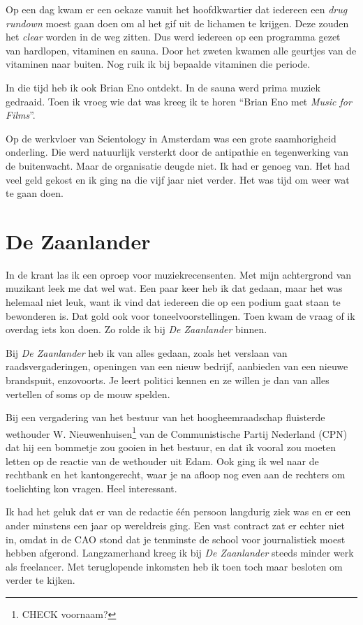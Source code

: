 \documentclass[12pt,twoside]{memoir}
\begin{document}
Op een dag kwam er een oekaze vanuit het hoofdkwartier dat iedereen een \emph{drug rundown} moest gaan doen om al het gif uit de lichamen te krijgen. Deze zouden het \emph{clear} worden in de weg zitten. Dus werd iedereen op een programma gezet van hardlopen, vitaminen en sauna. Door het zweten kwamen alle geurtjes van de vitaminen naar buiten. Nog ruik ik bij bepaalde vitaminen die periode. 

In die tijd heb ik ook Brian Eno ontdekt. In de sauna werd prima muziek gedraaid. Toen ik vroeg wie dat was kreeg ik te horen ``Brian Eno met \emph{Music for Films}''.

Op de werkvloer van Scientology in Amsterdam was een grote saamhorigheid onderling. Die werd natuurlijk versterkt door de antipathie en tegenwerking van de buitenwacht. Maar de organisatie deugde niet. Ik had er genoeg van. Het had veel geld gekost en ik ging na die vijf jaar niet verder. Het was tijd om weer wat te gaan doen.

\chapter{De Zaanlander} %
\label{cha:zaanlander}

In de krant las ik een oproep voor muziekrecensenten. Met mijn achtergrond van muzikant leek me dat wel wat. Een paar keer heb ik dat gedaan, maar het was helemaal niet leuk, want ik vind dat iedereen die op een podium gaat staan te bewonderen is. Dat gold ook voor toneelvoorstellingen. Toen kwam de vraag of ik overdag iets kon doen. Zo rolde ik bij \emph{De Zaanlander} binnen. 

Bij \emph{De Zaanlander} heb ik van alles gedaan, zoals het verslaan van raadsvergaderingen, openingen van een nieuw bedrijf, aanbieden van een nieuwe brandspuit, enzovoorts. Je leert politici kennen en ze willen je dan van alles vertellen of soms op de mouw spelden. 

Bij een vergadering van het bestuur van het hoogheemraadschap fluisterde wethouder W. Nieuwenhuisen\footnote{CHECK voornaam?} van de Communistische Partij Nederland (CPN) dat hij een bommetje zou gooien in het bestuur, en dat ik vooral zou moeten letten op de reactie van de wethouder uit Edam. Ook ging ik wel naar de rechtbank en het kantongerecht, waar je na afloop nog even aan de rechters om toelichting kon vragen. Heel interessant. 

Ik had het geluk dat er van de redactie één persoon langdurig ziek was en er een ander minstens een jaar op wereldreis ging. Een vast contract zat er echter niet in, omdat in de CAO stond dat je tenminste de school voor journalistiek moest hebben afgerond. Langzamerhand kreeg ik bij \emph{De Zaanlander} steeds minder werk als freelancer. Met teruglopende inkomsten heb ik toen toch maar besloten om verder te kijken.
\end{document}
